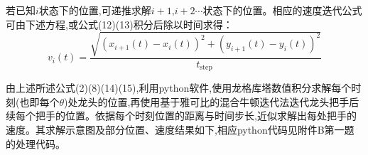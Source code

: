 若已知$i$状态下的位置,可递推求解$i+1\text{,}i+2\cdots$状态下的位置。相应的速度迭代公式可由下述方程,或公式(12)(13)积分后除以时间求得：
\begin{equation}
	v_i(t)=\frac{\sqrt{\left(x_{i+1}(t)-x_i(t)\right)^2+\left(y_{i+1}(t)-y_i(t)\right)^2}}{t_{\text {step }}}
\end{equation}


由上述所述公式(2)(8)(14)(15),利用python软件,使用龙格库塔数值积分求解每个时刻(也即每个$\theta$)处龙头的位置,再使用基于雅可比的混合牛顿迭代法迭代龙头把手后续每个把手的位置。依据每个时刻位置的距离与时间步长,近似求解出每处把手的速度。其求解示意图及部分位置、速度结果如下,相应python代码见附件B第一题的处理代码。

